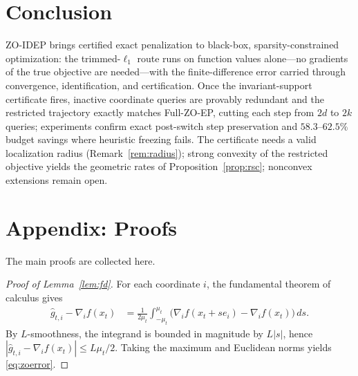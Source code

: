 \documentclass{article}
\begin{document}
\section{Conclusion}
ZO-IDEP brings certified exact penalization to black-box, sparsity-constrained optimization: the trimmed-$\ell_1$ route runs on function values alone---no gradients of the true objective are needed---with the finite-difference error carried through convergence, identification, and certification. Once the invariant-support certificate fires, inactive coordinate queries are provably redundant and the restricted trajectory exactly matches Full-ZO-EP, cutting each step from $2d$ to $2k$ queries; experiments confirm exact post-switch step preservation and $58.3$--$62.5$\% budget savings where heuristic freezing fails. The certificate needs a valid localization radius (Remark~\ref{rem:radius}); strong convexity of the restricted objective yields the geometric rates of Proposition~\ref{prop:rsc}; nonconvex extensions remain open.

\section{Appendix: Proofs}
The main proofs are collected here.
\setlength{\abovedisplayskip}{4pt plus 1pt minus 1pt}
\setlength{\belowdisplayskip}{4pt plus 1pt minus 1pt}

\medskip
\begin{proof}[Proof of Lemma~\ref{lem:fd}]
For each coordinate $i$, the fundamental theorem of calculus gives
\begin{align}
\widehat g_{t,i}-\nabla_i f(x_t)
&=\frac{1}{2\mu_t}\int_{-\mu_t}^{\mu_t}
\big(\nabla_i f(x_t+s e_i)-\nabla_i f(x_t)\big)\,ds .
\end{align}
By $L$-smoothness, the integrand is bounded in magnitude by $L|s|$, hence
$|\widehat g_{t,i}-\nabla_i f(x_t)|\le L\mu_t/2$. Taking the maximum and Euclidean norms yields \eqref{eq:zoerror}.
\end{proof}
\end{document}

